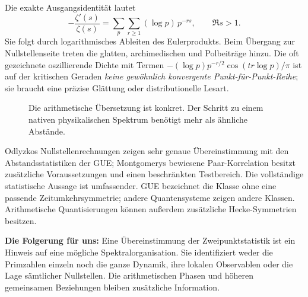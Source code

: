 Die exakte Ausgangsidentität lautet
\begin{equation}
 -\frac{\zeta'(s)}{\zeta(s)}
 =\sum_p\sum_{r\geq1}(\log p)\,p^{-rs},\qquad\Re s>1.
 \label{eq:prime-trace}
\end{equation}
Sie folgt durch logarithmisches Ableiten des Eulerprodukts. Beim Übergang zur Nullstellenseite treten die glatten, archimedischen und Polbeiträge hinzu. Die oft gezeichnete oszillierende Dichte mit Termen $-(\log p)p^{-r/2}\cos(tr\log p)/\pi$ ist auf der kritischen Geraden \emph{keine gewöhnlich konvergente Punkt-für-Punkt-Reihe}; sie braucht eine präzise Glättung oder distributionelle Lesart.

\begin{figure}[H]\centering
{}
\caption{Die arithmetische Übersetzung ist konkret. Der Schritt zu einem nativen physikalischen Spektrum benötigt mehr als ähnliche Abstände.}
\end{figure}

Odlyzkos Nullstellenrechnungen zeigen sehr genaue Übereinstimmung mit den Abstandsstatistiken der GUE; Montgomerys bewiesene Paar-Korrelation besitzt zusätzliche Voraussetzungen und einen beschränkten Testbereich. Die vollständige statistische Aussage ist umfassender. GUE bezeichnet die Klasse ohne eine passende Zeitumkehrsymmetrie; andere Quantensysteme zeigen andere Klassen. Arithmetische Quantisierungen können außerdem zusätzliche Hecke-Symmetrien besitzen. 

\textbf{Die Folgerung für uns:} Eine Übereinstimmung der Zweipunktstatistik ist ein Hinweis auf eine mögliche Spektralorganisation. Sie identifiziert weder die Primzahlen einzeln noch die ganze Dynamik, ihre lokalen Observablen oder die Lage sämtlicher Nullstellen. Die arithmetischen Phasen und höheren gemeinsamen Beziehungen bleiben zusätzliche Information.

